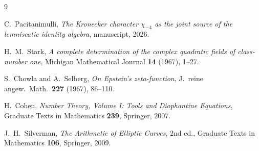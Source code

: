 \documentclass[11pt]{amsart}
\theoremstyle{plain}
\theoremstyle{definition}
\theoremstyle{remark}
\begin{document}
\begin{thebibliography}{9}

C.\ Pacitanimulli,
\textit{The Kronecker character $\chi_{-4}$ as the joint source of the
lemniscatic identity algebra},
manuscript, 2026.

H.~M.\ Stark,
\textit{A complete determination of the complex quadratic fields of
class-number one},
Michigan Mathematical Journal \textbf{14} (1967), 1--27.

S.\ Chowla and A.\ Selberg,
\textit{On Epstein's zeta-function},
J.\ reine angew.\ Math.\ \textbf{227} (1967), 86--110.

H.\ Cohen,
\emph{Number Theory, Volume I: Tools and Diophantine Equations},
Graduate Texts in Mathematics \textbf{239}, Springer, 2007.

J.~H.\ Silverman,
\emph{The Arithmetic of Elliptic Curves},
2nd ed., Graduate Texts in Mathematics \textbf{106}, Springer, 2009.

\end{thebibliography}
\end{document}
